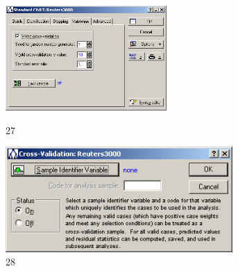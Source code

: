 \begin{figure}[!h]
  \centering

  \begin{minipage}{0.49\textwidth}
    \centering

    \includegraphics[height=4cm]
    {inc/27.PNG}

    \caption{27}

    \label{fig:27}
  \end{minipage}
  \begin{minipage}{0.49\textwidth}
    \centering

    \includegraphics[height=4cm]
    {inc/28.PNG}

    \caption{28}

    \label{fig:28}
  \end{minipage}
\end{figure}

